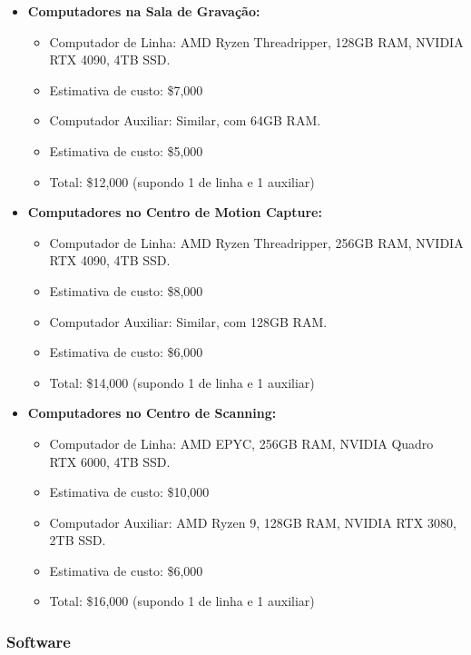 \begin{itemize}
    \item \textbf{Computadores na Sala de Gravação:}
    \begin{itemize}
        \item Computador de Linha: AMD Ryzen Threadripper, 128GB RAM, NVIDIA RTX 4090, 4TB SSD.
        \item Estimativa de custo: \$7,000
        \item Computador Auxiliar: Similar, com 64GB RAM.
        \item Estimativa de custo: \$5,000
        \item Total: \$12,000 (supondo 1 de linha e 1 auxiliar)
    \end{itemize}
    
    \item \textbf{Computadores no Centro de Motion Capture:}
    \begin{itemize}
        \item Computador de Linha: AMD Ryzen Threadripper, 256GB RAM, NVIDIA RTX 4090, 4TB SSD.
        \item Estimativa de custo: \$8,000
        \item Computador Auxiliar: Similar, com 128GB RAM.
        \item Estimativa de custo: \$6,000
        \item Total: \$14,000 (supondo 1 de linha e 1 auxiliar)
    \end{itemize}
    
    \item \textbf{Computadores no Centro de Scanning:}
    \begin{itemize}
        \item Computador de Linha: AMD EPYC, 256GB RAM, NVIDIA Quadro RTX 6000, 4TB SSD.
        \item Estimativa de custo: \$10,000
        \item Computador Auxiliar: AMD Ryzen 9, 128GB RAM, NVIDIA RTX 3080, 2TB SSD.
        \item Estimativa de custo: \$6,000
        \item Total: \$16,000 (supondo 1 de linha e 1 auxiliar)
    \end{itemize}
\end{itemize}

\subsubsection{Software}

